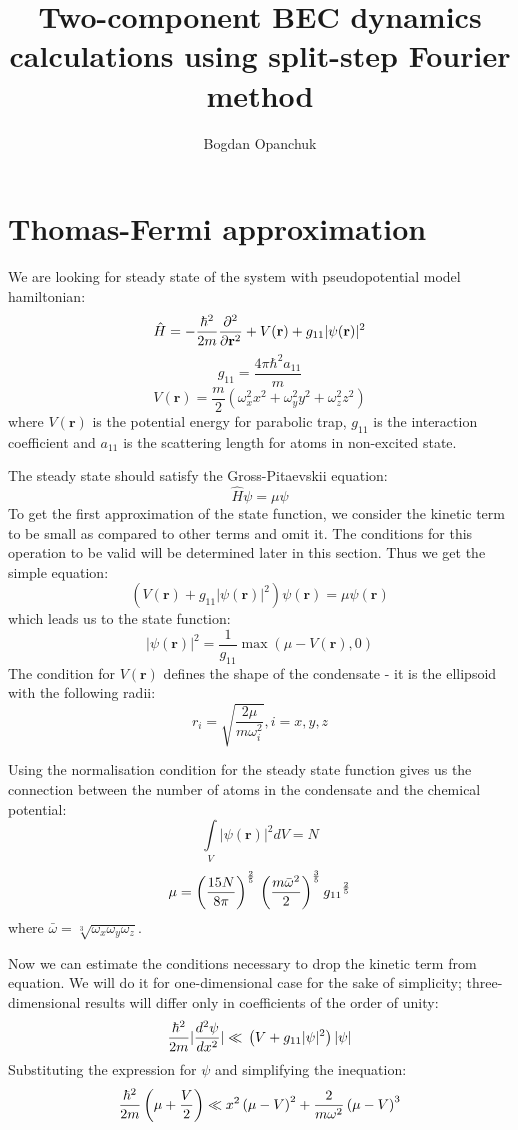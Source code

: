 \documentclass[12pt,notitlepage]{report}
\title{Two-component BEC dynamics calculations using split-step Fourier method}
\author{Bogdan Opanchuk}
\begin{document}
\maketitle

\section*{Thomas-Fermi approximation}

We are looking for steady state of the system with pseudopotential model hamiltonian:
\[ 
\hat{H} = -\frac{\hbar^2}{2m} \frac{\partial^2}{\partial \mathbf{r}^2} + \\
V(\mathbf{r}) + \\
g_{11} \vert \psi(\mathbf{r}) \vert^2 
\]
\[g_{11} = \frac{4 \pi \hbar^2 a_{11}}{m}\]
\[ V(\mathbf{r}) = \frac{m}{2} \left( \omega_x^2 x^2 + \omega_y^2 y^2 + \omega_z^2 z^2 \right) \]
where $V(\mathbf{r})$ is the potential energy for parabolic trap, $g_{11}$ is the interaction coefficient
and $a_{11}$ is the scattering length for atoms in non-excited state.

The steady state should satisfy the Gross-Pitaevskii equation:
\[ \hat{H} \psi = \mu \psi \]
To get the first approximation of the state function, we consider the kinetic term to be small as compared to other terms and omit it. The conditions for this operation to be valid will be determined later in this section. Thus we get the simple equation:
\[ \left( V(\mathbf{r}) + g_{11} \vert \psi(\mathbf{r}) \vert^2 \right) \psi(\mathbf{r}) = \mu \psi(\mathbf{r}) \]
which leads us to the state function:
\[ \vert \psi(\mathbf{r}) \vert^2 = \frac{1}{g_{11}} \max \left( \mu - V(\mathbf{r}), 0 \right) \]
The condition for $V(\mathbf{r})$ defines the shape of the condensate - it is the ellipsoid with the following radii:
\[ r_i = \sqrt{\frac{2 \mu}{m \omega_i^2}}, i = x, y, z \]

Using the normalisation condition for the steady state function gives us the connection between the number of atoms in the condensate and the chemical potential:
\[ \int\limits_{V} \vert \psi(\mathbf{r}) \vert^2 dV = N \]
\[ 
\mu = \left( \frac{15 N}{8 \pi} \right)^\frac{2}{5} \\
\left( \frac{m \bar{\omega}^2}{2} \right)^\frac{3}{5} \\
{g_{11}}^\frac{2}{5}
\]
where $\bar{\omega} = \sqrt[3]{\omega_x \omega_y \omega_z}$.

Now we can estimate the conditions necessary to drop the kinetic term from equation. We will do it for one-dimensional case for the sake of simplicity; three-dimensional results will differ only in coefficients of the order of unity:
\[ 
\frac{\hbar^2}{2 m} \vert \frac{d^2 \psi}{d x^2} \vert \ll \\
\left( V + g_{11} \vert \psi \vert^2 \right) \vert \psi \vert
\]
Substituting the expression for $\psi$ and simplifying the inequation:
\[
\frac{\hbar^2}{2 m} \left( \mu + \frac{V}{2} \right) \ll \\
x^2 \left( \mu - V \right)^2 + \frac{2}{m \omega^2} \left( \mu - V \right)^3
\]
\end{document}
